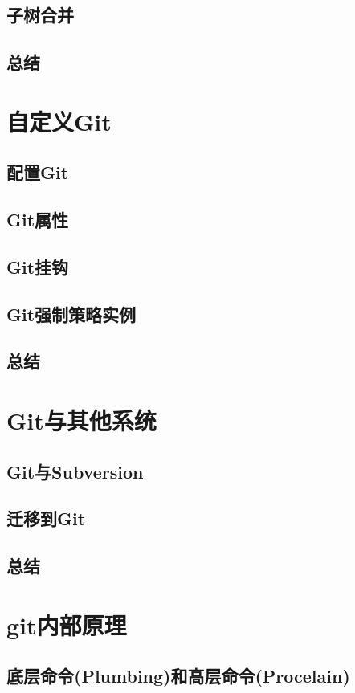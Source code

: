 \documentclass{book}
\begin{document}
	\section{子树合并}
	\section{总结}

\chapter{自定义Git}
	\section{配置Git}
	\section{Git属性}
	\section{Git挂钩}
	\section{Git强制策略实例}
	\section{总结}

\chapter{Git与其他系统}
	\section{Git与Subversion}
	\section{迁移到Git}
	\section{总结}
	
\chapter{git内部原理}
	\section{底层命令(Plumbing)和高层命令(Procelain)}
\end{document}
